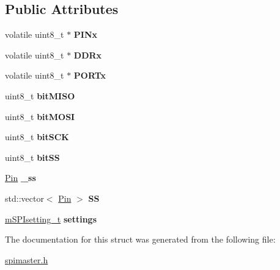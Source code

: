 \subsection*{Public Attributes}
\begin{DoxyCompactItemize}
\item 
\mbox{\label{structmasterSPI__t_a69f13d6f82316cbad3e05aa1067c25ab}} 
volatile uint8\+\_\+t $\ast$ {\bfseries P\+I\+Nx}
\item 
\mbox{\label{structmasterSPI__t_a24aa73fb35508a28c63f1fad2f3548dc}} 
volatile uint8\+\_\+t $\ast$ {\bfseries D\+D\+Rx}
\item 
\mbox{\label{structmasterSPI__t_a819eae46f1e853b89ac501081cb1c2e9}} 
volatile uint8\+\_\+t $\ast$ {\bfseries P\+O\+R\+Tx}
\item 
\mbox{\label{structmasterSPI__t_a9265e0ac3fe401504361a960fce3eb78}} 
uint8\+\_\+t {\bfseries bit\+M\+I\+SO}
\item 
\mbox{\label{structmasterSPI__t_acfbd932e92c901306860214a154e383b}} 
uint8\+\_\+t {\bfseries bit\+M\+O\+SI}
\item 
\mbox{\label{structmasterSPI__t_af26928ddc81c31b6b66dd473d6c63c4c}} 
uint8\+\_\+t {\bfseries bit\+S\+CK}
\item 
\mbox{\label{structmasterSPI__t_a7238d1be10b3bf5e15fd9786d09b3b3f}} 
uint8\+\_\+t {\bfseries bit\+SS}
\item 
\mbox{\label{structmasterSPI__t_a49ce53c491227c03ddb088bf918437d2}} 
\hyperlink{classPin}{Pin} {\bfseries \+\_\+ss}
\item 
\mbox{\label{structmasterSPI__t_ad0195c06fe173b42b66d9169ba1d15df}} 
std\+::vector$<$ \hyperlink{classPin}{Pin} $>$ {\bfseries SS}
\item 
\mbox{\label{structmasterSPI__t_ae2c1bb02c7d7b80d2fff99eacf108eb0}} 
\hyperlink{structmSPIsetting__t}{m\+S\+P\+Isetting\+\_\+t} {\bfseries settings}
\end{DoxyCompactItemize}


The documentation for this struct was generated from the following file\+:\begin{DoxyCompactItemize}
\item 
\hyperlink{spimaster_8h}{spimaster.\+h}\end{DoxyCompactItemize}
